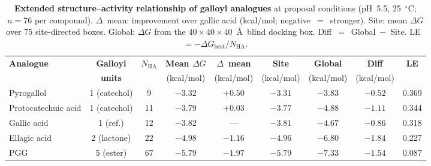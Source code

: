 \documentclass[11pt]{article}
\begin{document}
\begin{table}[H]
\small
\centering
\caption{\textbf{Extended structure--activity relationship of galloyl analogues}
  at proposal conditions (pH~5.5, 25~$^\circ$C; $n = 76$ per compound).
  $\Delta$~mean: improvement over gallic acid (kcal/mol; negative~$=$~stronger).
  Site: mean $\Delta G$ over 75 site-directed boxes.
  Global: $\Delta G$ from the $40\times40\times40$~\AA\ blind docking box.
  Diff~$=$~Global~$-$~Site. LE~$= -\Delta G_\mathrm{best}/N_\mathrm{HA}$.}
\label{tab:si_sar}
\begin{tabular}{lcccccccc}
\toprule
\textbf{Analogue} & \textbf{Galloyl} & \textbf{$N_\mathrm{HA}$}
  & \textbf{Mean $\Delta G$} & \textbf{$\Delta$~mean}
  & \textbf{Site} & \textbf{Global} & \textbf{Diff} & \textbf{LE} \\
 & \textbf{units} & & (kcal/mol) & (kcal/mol) & (kcal/mol) & (kcal/mol) & (kcal/mol) & \\
\midrule
Pyrogallol          & 1 (catechol) &  9 & $-3.32$ & $+0.50$ & $-3.31$ & $-3.83$ & $-0.52$ & 0.369 \\
Protocatechuic acid & 1 (catechol) & 11 & $-3.79$ & $+0.03$ & $-3.77$ & $-4.88$ & $-1.11$ & 0.344 \\
Gallic acid         & 1 (ref.)     & 12 & $-3.82$ & ---     & $-3.81$ & $-4.67$ & $-0.86$ & 0.318 \\
Ellagic acid        & 2 (lactone)  & 22 & $-4.98$ & $-1.16$ & $-4.96$ & $-6.80$ & $-1.84$ & 0.227 \\
PGG                 & 5 (ester)    & 67 & $-5.79$ & $-1.97$ & $-5.79$ & $-7.33$ & $-1.54$ & 0.087 \\
\bottomrule
\end{tabular}
\end{table}
\end{document}
